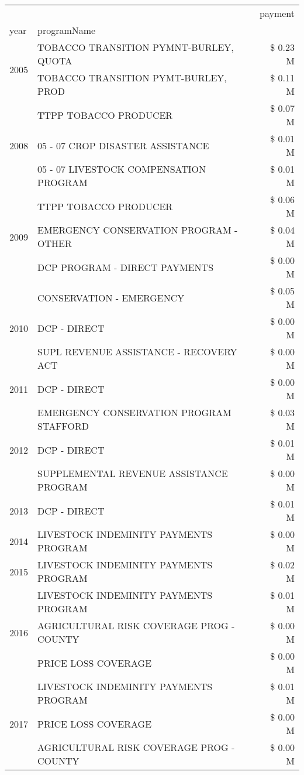 \begin{tabular}{llr}
\toprule
 &  & payment \\
year & programName &  \\
\midrule
\multirow[t]{2}{*}{2005} & TOBACCO TRANSITION PYMNT-BURLEY, QUOTA & \$ 0.23 M \\
 & TOBACCO TRANSITION PYMT-BURLEY, PROD & \$ 0.11 M \\
\cline{1-3}
\multirow[t]{3}{*}{2008} & TTPP TOBACCO PRODUCER & \$ 0.07 M \\
 & 05 - 07 CROP DISASTER ASSISTANCE & \$ 0.01 M \\
 & 05 - 07 LIVESTOCK COMPENSATION PROGRAM & \$ 0.01 M \\
\cline{1-3}
\multirow[t]{3}{*}{2009} & TTPP TOBACCO PRODUCER & \$ 0.06 M \\
 & EMERGENCY CONSERVATION PROGRAM - OTHER & \$ 0.04 M \\
 & DCP PROGRAM - DIRECT PAYMENTS & \$ 0.00 M \\
\cline{1-3}
\multirow[t]{3}{*}{2010} & CONSERVATION - EMERGENCY & \$ 0.05 M \\
 & DCP - DIRECT & \$ 0.00 M \\
 & SUPL REVENUE ASSISTANCE - RECOVERY ACT & \$ 0.00 M \\
\cline{1-3}
2011 & DCP - DIRECT & \$ 0.00 M \\
\cline{1-3}
\multirow[t]{3}{*}{2012} & EMERGENCY CONSERVATION PROGRAM STAFFORD & \$ 0.03 M \\
 & DCP - DIRECT & \$ 0.01 M \\
 & SUPPLEMENTAL REVENUE ASSISTANCE PROGRAM & \$ 0.00 M \\
\cline{1-3}
2013 & DCP - DIRECT & \$ 0.01 M \\
\cline{1-3}
2014 & LIVESTOCK INDEMINITY PAYMENTS PROGRAM & \$ 0.00 M \\
\cline{1-3}
2015 & LIVESTOCK INDEMINITY PAYMENTS PROGRAM & \$ 0.02 M \\
\cline{1-3}
\multirow[t]{3}{*}{2016} & LIVESTOCK INDEMINITY PAYMENTS PROGRAM & \$ 0.01 M \\
 & AGRICULTURAL RISK COVERAGE PROG - COUNTY & \$ 0.00 M \\
 & PRICE LOSS COVERAGE & \$ 0.00 M \\
\cline{1-3}
\multirow[t]{3}{*}{2017} & LIVESTOCK INDEMINITY PAYMENTS PROGRAM & \$ 0.01 M \\
 & PRICE LOSS COVERAGE & \$ 0.00 M \\
 & AGRICULTURAL RISK COVERAGE PROG - COUNTY & \$ 0.00 M \\

\end{tabular}
